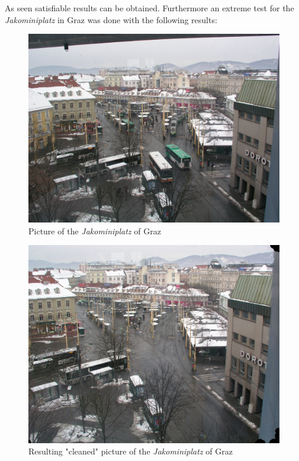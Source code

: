 \newpage
As seen satisfiable results can be obtained. Furthermore an extreme test for the \textit{Jakominiplatz} in Graz was done with the following results:

\begin{figure}[h!t]
\centering
\includegraphics[scale = 0.145]{pics/jako_before.jpg}
\caption{Picture of the \textit{Jakominiplatz} of Graz}
\end{figure}

\begin{figure}[h!t]
\centering
\includegraphics[scale = 0.32]{pics/jako.jpg}
\caption{Resulting "cleaned" picture of the \textit{Jakominiplatz} of Graz}
\end{figure}

